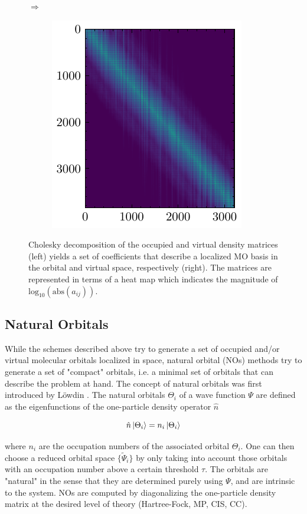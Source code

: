 \begin{figure}[h]
\begin{subfigure}{0.5\linewidth}
\end{subfigure}
$\Longrightarrow$
\begin{subfigure}{0.4\linewidth}
\centering
\includegraphics[scale=1.0]{Pics/choleskyV}
\end{subfigure}%
\caption[Cholesky decomposition of density matrices]{Cholesky decomposition of the occupied and virtual density matrices (left) yields a set of coefficients that describe a localized MO basis in the orbital and virtual space, respectively (right). The matrices are represented in terms of a heat map which indicates the magnitude of $\mathrm{log}_{10}(\mathrm{abs}(a_{ij}))$.}
\label{fig:LOCORB_CHOL}
\end{figure} 

\subsection{Natural Orbitals}

While the schemes described above try to generate a set of occupied and/or virtual molecular orbitals localized in space, natural orbital (NOs) methods try to generate a set of "compact" orbitals, i.e. a minimal set of orbitals that can describe the problem at hand. The concept of natural orbitals was first introduced by Löwdin \cite{Low1956}. The natural orbitals $\Theta_i$ of a wave function $\Psi$ are defined as the eigenfunctions of the one-particle density operator $\hat{n}$

\begin{equation}
\hat{n}\ket{\Theta_i} = n_i \ket{\Theta_i} 
\end{equation}

\noindent where $n_i$ are the occupation numbers of the associated orbital $\Theta_i$. One can then choose a reduced orbital space $\{\tilde{\Psi}_i\}$ by only taking into account those orbitals with an occupation number above a certain threshold $\tau$. The orbitals are "natural" in the sense that they are determined purely using $\Psi$, and are intrinsic to the system. NOs are computed by diagonalizing the one-particle density matrix at the desired level of theory (Hartree-Fock, MP, CIS, CC). 

